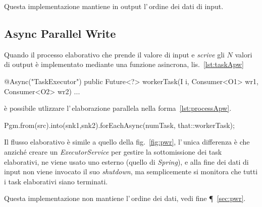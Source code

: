 Questa implementazione mantiene in output l'\,ordine dei dati di input.


\subsection{Async Parallel Write} \label{sec:apw}
Quando il processo elaborativo che prende il valore di input e \textit{scrive}
gli $N$ valori di output è implementato mediante una funzione asincrona,
lis.~\ref{lst:taskApw}
\begin{elisting}[!htb]
\begin{javacode}
    @Async("TaskExecutor")
    public Future<?> workerTask(I i, Consumer<O1> wr1, Consumer<O2> wr2) { ... }
\end{javacode}
\caption{task $1,W_1,\dots,W_N$ asincrono (APW)}
\label{lst:taskApw}
\end{elisting}
è possibile utlizzare l'\,elaborazione parallela nella
forma~\ref{lst:processApw}.
\begin{elisting}[!htb]
\begin{javacode}
Pgm.from(src).into(snk1,snk2).forEachAsync(numTask, that::workerTask);
\end{javacode}
\caption{Elaborazione $1,W_1,\dots,W_N$ asincrona (APW)}
\label{lst:processApw}
\end{elisting}
Il flusso elaborativo è simile a quello della fig.~\ref{fig:pwr}, l'\,unica
differenza è che anziché creare un \textsl{ExecutorService} per gestire la
sottomissione dei task elaborativi, ne viene usato uno esterno (quello di
\textit{Spring}), e alla fine dei dati di input non viene invocato il suo
\textsl{shutdown}, ma semplicemente si monitora che tutti i task elaborativi
siano terminati.

Questa implementazione non mantiene l'\,ordine dei dati, vedi fine
\P~\ref{sec:pwr}.

